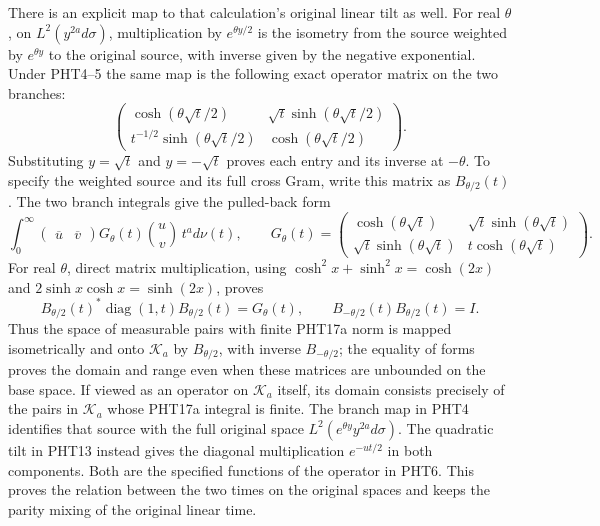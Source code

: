 There is an explicit map to that calculation's original
linear tilt as well. For real $\theta$, on $L^2(y^{2a}d\sigma)$, multiplication
by $e^{\theta y/2}$ is the isometry from the source weighted
by $e^{\theta y}$ to the original source, with inverse
given by the negative exponential. Under PHT4--5 the same
map is the following exact operator matrix on the two branches:
\[
 \begin{pmatrix}
  \cosh(\theta\sqrt t/2)&\sqrt t\sinh(\theta\sqrt t/2)\\
  t^{-1/2}\sinh(\theta\sqrt t/2)&\cosh(\theta\sqrt t/2)
 \end{pmatrix}.
\tag{PHT17}
\]
Substituting $y=\sqrt t$ and $y=-\sqrt t$ proves each entry
and its inverse at $-\theta$. To specify the weighted source
and its full cross Gram, write this matrix as $B_{\theta/2}(t)$.
The two branch integrals give the pulled-back form
\[
 \int_0^\infty
 \begin{pmatrix}\overline u&\overline v\end{pmatrix}
 G_\theta(t)\binom uv\,t^a d\nu(t),\qquad
 G_\theta(t)=
 \begin{pmatrix}
  \cosh(\theta\sqrt t)&\sqrt t\sinh(\theta\sqrt t)\\
  \sqrt t\sinh(\theta\sqrt t)&t\cosh(\theta\sqrt t)
 \end{pmatrix}.
\tag{PHT17a}
\]
For real $\theta$, direct matrix multiplication, using
$\cosh^2 x+\sinh^2 x=\cosh(2x)$ and
$2\sinh x\cosh x=\sinh(2x)$, proves
\[
 B_{\theta/2}(t)^*\operatorname{diag}(1,t)B_{\theta/2}(t)
       =G_\theta(t),\qquad
 B_{-\theta/2}(t)B_{\theta/2}(t)=I.
\]
Thus the space of measurable pairs with finite PHT17a norm
is mapped isometrically and onto $\mathcal K_a$ by
$B_{\theta/2}$, with inverse $B_{-\theta/2}$; the equality of
forms proves the domain and range even when these matrices
are unbounded on the base space. If viewed as an operator
on $\mathcal K_a$ itself, its domain consists precisely of
the pairs in $\mathcal K_a$ whose PHT17a integral is finite.
The branch map in PHT4 identifies that source with the full
original space $L^2(e^{\theta y}y^{2a}d\sigma)$.
The quadratic tilt in PHT13
instead gives the diagonal multiplication $e^{-ut/2}$ in
both components. Both are the specified functions of the
operator in PHT6. This proves the relation between the two
times on the original spaces and keeps the parity mixing of
the original linear time.

